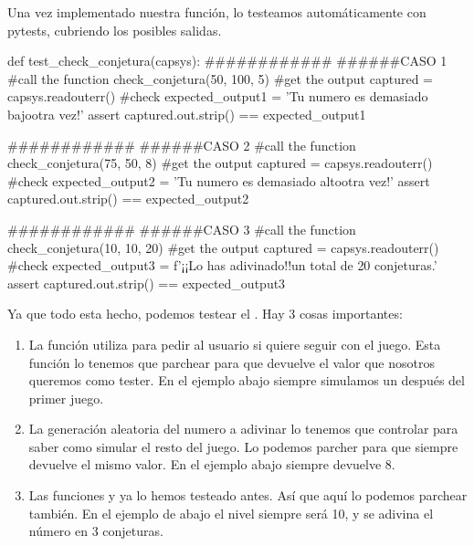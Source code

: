 Una vez implementado nuestra función, lo testeamos automáticamente con pytests, cubriendo los posibles salidas.

\begin{python}
def test_check_conjetura(capsys):
    ############
    ######CASO 1
    #call the function
    check_conjetura(50, 100, 5)
    #get the output
    captured = capsys.readouterr()
    #check
    expected_output1 = 'Tu numero es demasiado bajo\nIntentalo otra vez!'
    assert captured.out.strip() == expected_output1

    ############
    ######CASO 2
    #call the function
    check_conjetura(75, 50, 8)
    #get the output
    captured = capsys.readouterr()
    #check
    expected_output2 = 'Tu numero es demasiado alto\nIntentalo otra vez!'
    assert captured.out.strip() == expected_output2
    
    ############
    ######CASO 3
    #call the function
    check_conjetura(10, 10, 20) 
    #get the output
    captured = capsys.readouterr()
    #check
    expected_output3 = f'¡¡Lo has adivinado!!\nCon un total de {20} conjeturas.'
    assert captured.out.strip() == expected_output3
\end{python}

Ya que todo esta hecho, podemos testear el . Hay 3 cosas importantes:

\begin{enumerate}
    \item La función  utiliza  para pedir al usuario si quiere seguir con el juego. Esta función lo tenemos que parchear para que devuelve el valor que nosotros queremos como tester. En el ejemplo abajo siempre simulamos un  después del primer juego.
    \item La generación aleatoria del numero a adivinar lo tenemos que controlar para saber como simular el resto del juego. Lo podemos parcher para que siempre devuelve el mismo valor. En el ejemplo abajo siempre devuelve 8.
    \item Las funciones  y  ya lo hemos testeado antes. Así que aquí lo podemos parchear también. En el ejemplo de abajo el nivel siempre será 10, y 
    se adivina el número en 3 conjeturas.
\end{enumerate}

